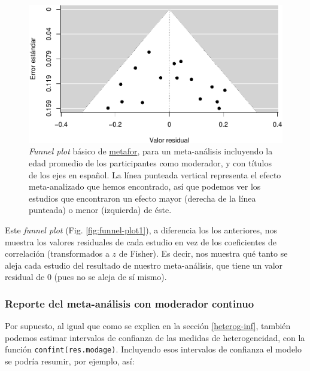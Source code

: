 \documentclass[
  bookmarksnumbered]{article}
\begin{document}
\begin{figure}
\centering
\includegraphics{Meta-analysis_files/figure-latex/funnel-plot-mod1-1.pdf}
\caption{\label{fig:funnel-plot-mod1}\emph{Funnel plot} básico de \href{https://www.metafor-project.org/doku.php}{metafor}, para un meta-análisis incluyendo la edad promedio de los participantes como moderador, y con títulos de los ejes en español. La línea punteada vertical representa el efecto meta-analizado que hemos encontrado, así que podemos ver los estudios que encontraron un efecto mayor (derecha de la línea punteada) o menor (izquierda) de éste.}
\end{figure}

Este \emph{funnel plot} (Fig. \ref{fig:funnel-plot1}), a diferencia los los anteriores, nos muestra los valores residuales de cada estudio en vez de los coeficientes de correlación (transformados a \(z\) de Fisher). Es decir, nos muestra qué tanto se aleja cada estudio del resultado de nuestro meta-análisis, que tiene un valor residual de 0 (pues no se aleja de sí mismo).

\hypertarget{reporte-cont}{%
\subsubsection{Reporte del meta-análisis con moderador continuo}\label{reporte-cont}}

Por supuesto, al igual que como se explica en la sección \ref{heterog-inf}, también podemos estimar intervalos de confianza de las medidas de heterogeneidad, con la función \texttt{confint(res.modage)}. Incluyendo esos intervalos de confianza el modelo se podría resumir, por ejemplo, así:
\end{document}
